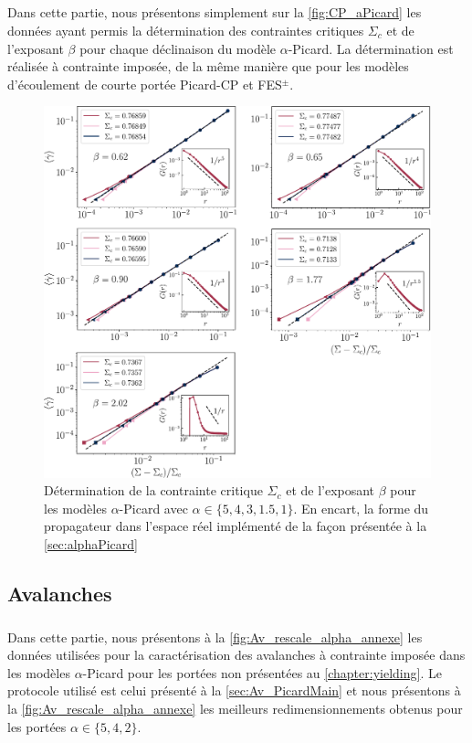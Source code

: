 \subparagraph{}Dans cette partie, nous présentons simplement sur la \autoref{fig:CP_aPicard} les données ayant permis la détermination des contraintes critiques $\Sigma_c$ et de l'exposant $\beta$ pour chaque déclinaison du modèle $\alpha$-Picard. La détermination est réalisée à contrainte imposée, de la même manière que pour les modèles d'écoulement de courte portée Picard-CP et FES$^\pm$.

\begin{figure}[H]
	\centering
	\includegraphics[width=\textwidth]{Chapitre6/Figures/CP_alphaPicard.pdf}

	\caption{Détermination de la contrainte critique $\Sigma_c$ et de l'exposant $\beta$ pour les modèles $\alpha$-Picard avec $\alpha \in \{ 5, 4, 3, 1.5, 1 \}$. En encart, la forme du propagateur dans l'espace réel implémenté de la façon présentée à la \autoref{sec:alphaPicard}}
		\label{fig:CP_aPicard}
\end{figure}

\subsection{Avalanches}

\subparagraph{}Dans cette partie, nous présentons à la \autoref{fig:Av_rescale_alpha_annexe} les données utilisées pour la caractérisation des avalanches à contrainte imposée dans les modèles $\alpha$-Picard pour les portées non présentées au \autoref{chapter:yielding}. Le protocole utilisé est celui présenté à la \autoref{sec:Av_PicardMain} et nous présentons à la \autoref{fig:Av_rescale_alpha_annexe} les meilleurs redimensionnements obtenus pour les portées $\alpha \in \{5, 4, 2 \}$.

